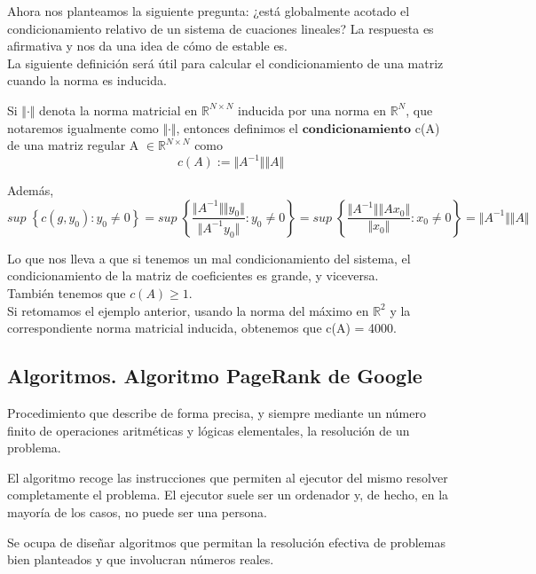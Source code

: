 Ahora nos planteamos la siguiente pregunta: ¿está globalmente acotado el condicionamiento relativo de un sistema de cuaciones lineales? La respuesta es afirmativa y nos da una idea de cómo de estable es.\\

La siguiente definición será útil para calcular el condicionamiento de una matriz cuando la norma es inducida.

\begin{ndef}
Si $\Vert \cdot \Vert$ denota la norma matricial en $\mathbb{R}^{N \times N}$ inducida por una norma en $\mathbb{R}^N$, que notaremos igualmente como $\Vert \cdot \Vert$, entonces definimos el $\textbf{condicionamiento}$ c(A) de una matriz regular A $\in \mathbb{R}^{N \times N}$ como
\[ c(A) := \Vert A^{-1} \Vert \Vert A \Vert \]
\end{ndef}

Además,
\[ sup \; \left\lbrace c(g, y_0) : y_0 \neq 0 \right\rbrace = sup \; \left\lbrace \frac{\Vert A^{-1} \Vert \Vert y_0 \Vert}{\Vert A^{-1}y_0 \Vert} : y_0 \neq 0 \right\rbrace = sup \; \left\lbrace \frac{\Vert A^{-1} \Vert \Vert Ax_0 \Vert}{\Vert x_0 \Vert} : x_0 \neq 0 \right\rbrace = \Vert A^{-1} \Vert \Vert A \Vert \]

Lo que nos lleva a que si tenemos un mal condicionamiento del sistema, el condicionamiento de la matriz de coeficientes es grande, y viceversa.\\
También tenemos que $c(A) \geq 1$.\\
Si retomamos el ejemplo anterior, usando la norma del máximo en $\mathbb{R}^2$ y la correspondiente norma matricial inducida, obtenemos que c(A) = 4000.

\subsection{Algoritmos. Algoritmo PageRank de Google}

\begin{ndef}[Algoritmo]
Procedimiento que describe de forma precisa, y siempre mediante un número finito de operaciones aritméticas y lógicas elementales, la resolución de un problema.
\end{ndef}

El algoritmo recoge las instrucciones que permiten al ejecutor del mismo resolver completamente el problema. El ejecutor suele ser un ordenador y, de hecho, en la mayoría de los casos, no puede ser una persona.

\begin{ndef}
Se ocupa de diseñar algoritmos que permitan la resolución efectiva de problemas bien planteados y que involucran números reales.
\end{ndef}

